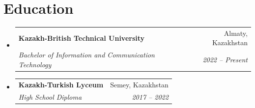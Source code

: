 \documentclass[letterpaper,11pt]{article}
\makeatletter
\newcommand{\resumeSubheading}[4]{
  \vspace{-2pt}\item
    \begin{tabular*}{0.97\textwidth}[t]{l@{\extracolsep{\fill}}r}
      \textbf{#1} & #2 \\
      \textit{\small#3} & \textit{\small #4} \\
    \end{tabular*}\vspace{-7pt}
}
\newcommand{\resumeSubHeadingListStart}{\begin{itemize}[leftmargin=0.15in, label={}]}
\newcommand{\resumeSubHeadingListEnd}{\end{itemize}}
\makeatother
\begin{document}
\section{Education}
  \resumeSubHeadingListStart
    \resumeSubheading
      {Kazakh-British Technical University}{Almaty, Kazakhstan}
      {Bachelor of Information and Communication Technology}{2022 -- Present}
    \resumeSubheading
      {Kazakh-Turkish Lyceum}{Semey, Kazakhstan}
      {High School Diploma}{2017 -- 2022}
  \resumeSubHeadingListEnd

\end{document}
